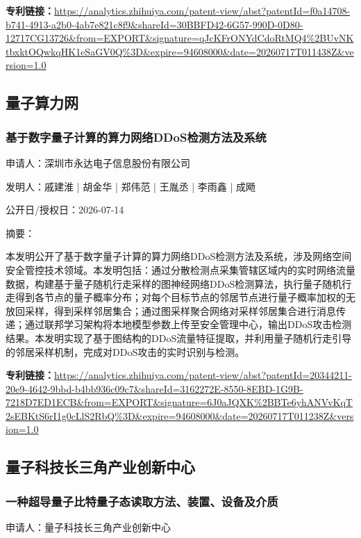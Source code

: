 \documentclass[12pt,a4paper]{ctexart}
\begin{document}
\noindent\textbf{专利链接：}\url{https://analytics.zhihuiya.com/patent-view/abst?patentId=f0a14708-b741-4913-a2b0-4ab7e821c8f9&shareId=30BBFD42-6G57-990D-0D80-12717CG13726&from=EXPORT&signature=qJcKFrONYdCdoRtMQ4%2BUvNKtbxktOQwkqHK1eSaGV0Q%3D&expire=94608000&date=20260717T011438Z&version=1.0}


\subsection{ 量子算力网 }

\subsubsection{ 基于数字量子计算的算力网络DDoS检测方法及系统 }

申请人：深圳市永达电子信息股份有限公司

发明人：戚建淮 | 胡金华 | 郑伟范 | 王胤丞 | 李雨鑫 | 成飏

公开日/授权日：2026-07-14

摘要：

本发明公开了基于数字量子计算的算力网络DDoS检测方法及系统，涉及网络空间安全管控技术领域。本发明包括：通过分散检测点采集管辖区域内的实时网络流量数据，构建基于量子随机行走采样的图神经网络DDoS检测算法，执行量子随机行走得到各节点的量子概率分布；对每个目标节点的邻居节点进行量子概率加权的无放回采样，得到采样邻居集合；通过图采样聚合网络对采样邻居集合进行消息传递；通过联邦学习架构将本地模型参数上传至安全管理中心，输出DDoS攻击检测结果。本发明实现了基于图结构的DDoS流量特征提取，并利用量子随机行走引导的邻居采样机制，完成对DDoS攻击的实时识别与检测。

\noindent\textbf{专利链接：}\url{https://analytics.zhihuiya.com/patent-view/abst?patentId=20344211-20e9-4642-9bbd-b4bb936c09c7&shareId=3162272E-8550-8EBD-1G9B-7218D7ED1ECB&from=EXPORT&signature=6J0aJQXK%2BBTe6yhANVvKqT2sEBKtS6rI1g0cLlS2RbQ%3D&expire=94608000&date=20260717T011238Z&version=1.0}


\subsection{ 量子科技长三角产业创新中心 }

\subsubsection{ 一种超导量子比特量子态读取方法、装置、设备及介质 }

申请人：量子科技长三角产业创新中心
\end{document}
